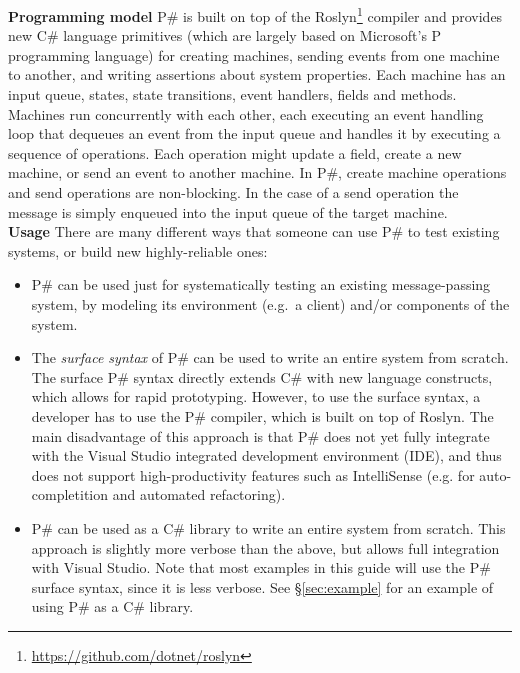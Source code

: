 \documentclass{llncs}
\newcommand{\ps}{P\#\xspace}
\newcommand{\cs}{C\#\xspace}
\newcommand{\newparagraph}[1]{\smallskip\noindent\textbf{#1 }}
\begin{document}
\newparagraph{Programming model} \ps is built on top of the Roslyn\footnote{\textcolor{blue}{\url{https://github.com/dotnet/roslyn}}} compiler and provides new \cs language primitives (which are largely based on Microsoft's P~\cite{desai2013p} programming language) for creating machines, sending events from one machine to another, and writing assertions about system properties. Each machine has an input queue, states, state transitions, event handlers, fields and methods. Machines run concurrently with each other, each executing an event handling loop that dequeues an event from the input queue and handles it by executing a sequence of operations. Each operation might update a field, create a new machine, or send an event to another machine. In \ps, create machine operations and send operations are non-blocking. In the case of a send operation the message is simply enqueued into the input queue of the target machine.\\

\newparagraph{Usage} There are many different ways that someone can use \ps to test existing systems, or build new highly-reliable ones:

\begin{itemize}
\item \ps can be used just for systematically testing an existing message-passing system, by modeling its environment (e.g.\ a client) and/or components of the system.

\item The \emph{surface syntax} of \ps can be used to write an entire system from scratch. The surface \ps syntax directly extends \cs with new language constructs, which allows for rapid prototyping. However, to use the surface syntax, a developer has to use the \ps compiler, which is built on top of Roslyn. The main disadvantage of this approach is that \ps does not yet fully integrate with the Visual Studio integrated development environment (IDE), and thus does not support high-productivity features such as IntelliSense (e.g. for auto-completition and automated refactoring).

\item \ps can be used as a \cs library to write an entire system from scratch. This approach is slightly more verbose than the above, but allows full integration with Visual Studio. Note that most examples in this guide will use the \ps surface syntax, since it is less verbose. See \S\ref{sec:example} for an example of using \ps as a \cs library.
\end{itemize}
\end{document}
